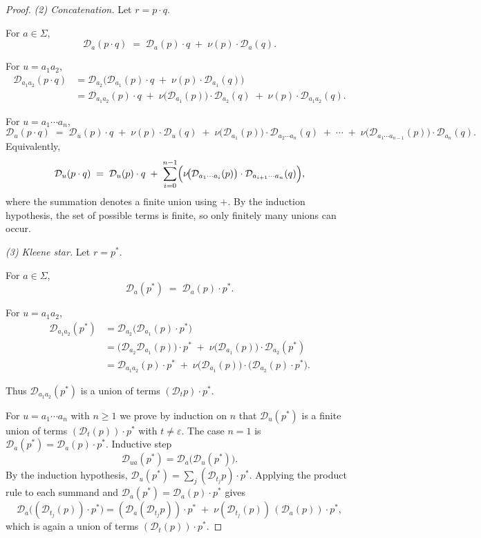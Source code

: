 \begin{proof}
\emph{(2) Concatenation.}
Let \(r=p\cdot q\).

\textit{}
For \(a\in\Sigma\),
\[
  \mathcal{D}_a(p\cdot q)
  \;=\;
  \mathcal{D}_a(p)\cdot q \;+\; \nu(p)\cdot \mathcal{D}_a(q).
\]

\textit{}
For \(u=a_1a_2\),
\[
\begin{aligned}
\mathcal{D}_{a_1a_2}(p\cdot q)
&= \mathcal{D}_{a_2}\!\bigl(\mathcal{D}_{a_1}(p)\cdot q \;+\; \nu(p)\cdot \mathcal{D}_{a_1}(q)\bigr) \\
&= \mathcal{D}_{a_1a_2}(p)\cdot q
   \;+\; \nu\!\bigl(\mathcal{D}_{a_1}(p)\bigr)\cdot \mathcal{D}_{a_2}(q)
   \;+\; \nu(p)\cdot \mathcal{D}_{a_1a_2}(q).
\end{aligned}
\]


For \(u=a_1\cdots a_n\),
\[
  \mathcal{D}_{u}(p\cdot q)
  \;=\;
  \mathcal{D}_{u}(p)\cdot q
  \;+\;
  \nu(p)\cdot \mathcal{D}_{u}(q)
  \;+\;
  \nu\!\bigl(\mathcal{D}_{a_1}(p)\bigr)\cdot \mathcal{D}_{a_2\cdots a_n}(q)
  \;+\;\cdots\;+\;
  \nu\!\bigl(\mathcal{D}_{a_1\cdots a_{n-1}}(p)\bigr)\cdot \mathcal{D}_{a_n}(q).
\]
Equivalently,
\[
  \mathcal{D}_u(p\cdot q)
  \;=\;
  \mathcal{D}_u(p)\cdot q
  \;+\;
  \sum_{i=0}^{n-1}
  \Bigl(
    \nu\!\bigl(\mathcal{D}_{a_1\cdots a_i}(p)\bigr)\cdot
    \mathcal{D}_{a_{i+1}\cdots a_n}(q)
  \Bigr),
\]
where the summation denotes a finite union using \(+\).
By the induction hypothesis, the set of possible terms is finite, so only finitely many unions can occur.


\smallskip
\emph{(3) Kleene star.}
Let \(r=p^*\).

\textit{}
For \(a\in\Sigma\),
\[
  \mathcal{D}_a(p^*) \;=\; \mathcal{D}_a(p)\cdot p^*.
\]

\textit{}
For \(u=a_1a_2\),
\[
\begin{aligned}
\mathcal{D}_{a_1a_2}(p^*)
&= \mathcal{D}_{a_2}\bigl(\mathcal{D}_{a_1}(p)\cdot p^*\bigr) \\
&= \bigl(\mathcal{D}_{a_2}\mathcal{D}_{a_1}(p)\bigr)\cdot p^*
   \;+\; \nu\!\bigl(\mathcal{D}_{a_1}(p)\bigr)\cdot \mathcal{D}_{a_2}(p^*) \\
&= \mathcal{D}_{a_1a_2}(p)\cdot p^*
   \;+\; \nu\!\bigl(\mathcal{D}_{a_1}(p)\bigr)\cdot \bigl(\mathcal{D}_{a_2}(p)\cdot p^*\bigr).
\end{aligned}
\]

Thus \(\mathcal{D}_{a_1a_2}(p^*)\) is a union of terms \((\mathcal{D}_t p)\cdot p^*\).

\textit{}
For \(u=a_1\cdots a_n\) with \(n\ge 1\) we prove by induction on \(n\) that \(\mathcal{D}_u(p^*)\) is a finite union of terms \((\mathcal{D}_t (p))\cdot p^*\) with \(t\ne\varepsilon\).
The case \(n=1\) is \(\mathcal{D}_a(p^*)=\mathcal{D}_a(p)\cdot p^*\).
Inductive step
\[
\mathcal{D}_{ua}(p^*)=\mathcal{D}_a\bigl(\mathcal{D}_u(p^*)\bigr).
\]
By the induction hypothesis, \(\mathcal{D}_u(p^*)=\sum_j (\mathcal{D}_{t_j}p)\cdot p^*\).
Applying the product rule to each summand and \(\mathcal{D}_a(p^*)=\mathcal{D}_a(p)\cdot p^*\) gives
\[
\mathcal{D}_a\!\bigl((\mathcal{D}_{t_j}(p))\cdot p^*\bigr)
= (\mathcal{D}_a(\mathcal{D}_{t_j}p))\cdot p^*
  \;+\; \nu(\mathcal{D}_{t_j}(p))\,(\mathcal{D}_a (p))\cdot p^*,
\]
which is again a union of terms \((\mathcal{D}_t (p))\cdot p^*\).


\end{proof}
